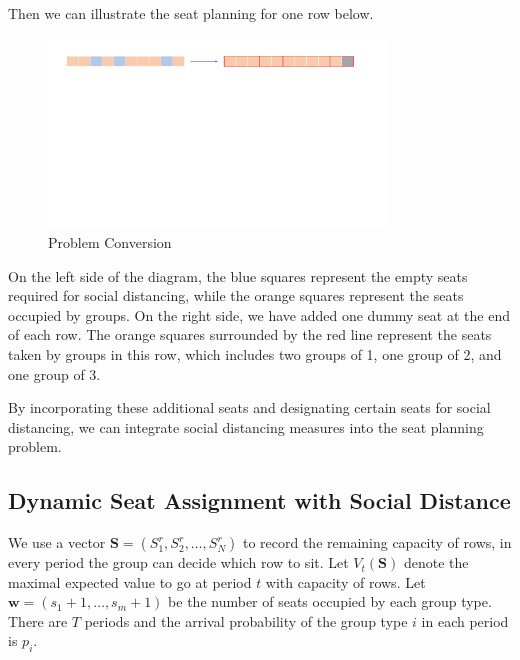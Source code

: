 Then we can illustrate the seat planning for one row below. 

\begin{figure}[ht]
    \centering
    \includegraphics[width = 0.8\textwidth]{./Figures/dummy_seat.pdf}
    \caption{Problem Conversion}
\end{figure}


On the left side of the diagram, the blue squares represent the empty seats required for social distancing, while the orange squares represent the seats occupied by groups. On the right side, we have added one dummy seat at the end of each row. The orange squares surrounded by the red line represent the seats taken by groups in this row, which includes two groups of 1, one group of 2, and one group of 3.

By incorporating these additional seats and designating certain seats for social distancing, we can integrate social distancing measures into the seat planning problem.





\subsection{Dynamic Seat Assignment with Social Distance}



We use a vector $\mathbf{S}= (S^{r}_1, S^{r}_2, \ldots, S^{r}_{N})$ to record the remaining capacity of rows, in every period the group can decide which row to sit. Let $V_{t}(\mathbf{S})$ denote the maximal expected value to go at period $t$ with capacity of rows. Let $\mathbf{w} = (s_1+1, \ldots, s_m+1)$ be the number of seats occupied by each group type. There are $T$ periods and the arrival probability of the group type $i$ in each period is $p_i$. 

